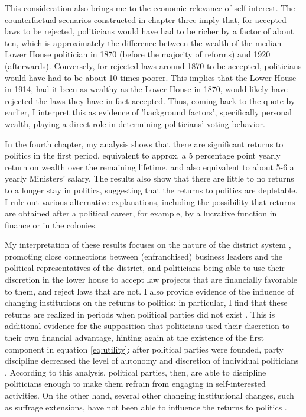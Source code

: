 This consideration also brings me to the economic relevance of self-interest. The counterfactual scenarios constructed in chapter three imply that, for accepted laws to be rejected, politicians would have had to be richer by a factor of about ten, which is approximately the difference between the wealth of the median Lower House politician in 1870 (before the majority of reforms) and 1920 (afterwards). Conversely, for rejected laws around 1870 to be accepted, politicians would have had to be about 10 times poorer. This implies that the Lower House in 1914, had it been as wealthy as the Lower House in 1870, would likely have rejected the laws they have in fact accepted. Thus, coming back to the quote by \cite{van1983toegang} earlier, I interpret this as evidence of 'background factors', specifically personal wealth, playing a direct role in determining politicians' voting behavior. 

In the fourth chapter, my analysis shows that there are significant returns to politics in the first period, equivalent to approx. a 5 percentage point yearly return on wealth over the remaining lifetime, and also equivalent to about 5-6 a yearly Ministers' salary. The results also show that there are little to no returns to a longer stay in politics, suggesting that the returns to politics are depletable. I rule out various alternative explanations, including the possibility that returns are obtained after a political career, for example, by a lucrative function in finance or in the colonies. 

My interpretation of these results focuses on the nature of the district system \citep{van2018tussen}, promoting close connections between (enfranchised) business leaders and the political representatives of the district, and politicians being able to use their discretion in the lower house to accept law projects that are financially favorable to them, and reject laws that are not. I also provide evidence of the influence of changing institutions on the returns to politics: in particular, I find that these returns are realized in periods when political parties did not exist \citep[cf.][]{eggers2009mps}. This is additional evidence for the supposition that politicians used their discretion to their own financial advantage, hinting again at the existence of the first component in equation \ref{eq:utility}: after political parties were founded, party discipline decreased the level of autonomy and discretion of individual politicians \citep{de2001antirevolutionaire,de2014ons}. According to this analysis, political parties, then, are able to discipline politicians enough to make them refrain from engaging in self-interested activities. On the other hand, several other changing institutional changes, such as suffrage extensions, have not been able to influence the returns to politics \citep[see also][]{ashworth2010does}. 


